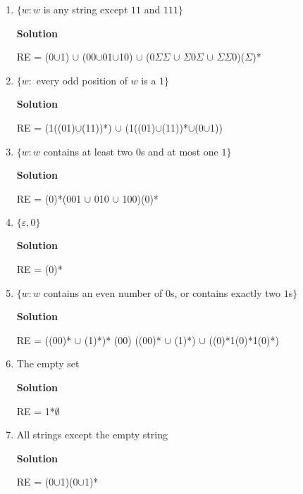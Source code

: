 \documentclass{article}
\begin{document}
\begin{empfile}
\begin{enumerate}[\bfseries a.]
\item $\{w: w$ is any string except $11$ and $111\}$

\textbf{Solution}

RE = (0$\cup$1) $\cup$ (00$\cup$01$\cup$10) $\cup$ 
(0$\Sigma$$\Sigma$ $\cup$ $\Sigma$0$\Sigma$ $\cup$ $\Sigma$$\Sigma$0)($\Sigma$)*

\item $\{w:$ every odd position of $w$ is a $1\}$

\textbf{Solution}

RE = (1((01)$\cup$(11))*) $\cup$ (1((01)$\cup$(11))*$\cup$(0$\cup$1))

\item $\{w: w$ contains at least two $0$s and at most one $1\}$

\textbf{Solution}

RE = (0)*(001 $\cup$ 010 $\cup$ 100)(0)*

\item $\{\varepsilon, 0\}$

\textbf{Solution}

RE = (0)*

\item $\{w: w$ contains an even number of $0$s, or contains exactly two $1$s$\}$

\textbf{Solution}

RE = ((00)* $\cup$ (1)*)* (00) ((00)* $\cup$ (1)*) $\cup$ ((0)*1(0)*1(0)*)

\item The empty set

\textbf{Solution}

RE = 1*$\emptyset$

\item All strings except the empty string

\textbf{Solution}

RE = (0$\cup$1)(0$\cup$1)*

\end{enumerate}

\end{empfile}
\immediate{}
\end{document}
